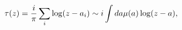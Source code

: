 \begin{equation}
\tau(z)={i\over\pi}\sum_i \log(z-a_i)\sim i\int da \mu (a)\log (z-a),
\label{tau2}
\end{equation}

